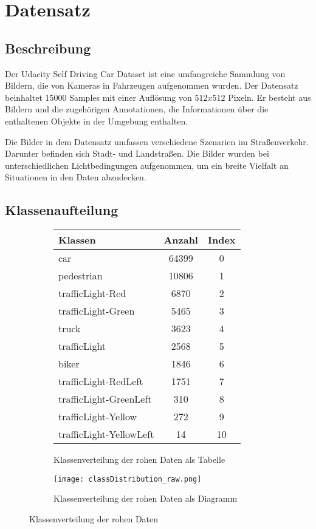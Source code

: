 \chapter{Datensatz}\label{chap:dataset}
\section{Beschreibung}
Der Udacity Self Driving Car Dataset \cite{datasetSelfDrivingCar} ist eine umfangreiche Sammlung von Bildern, die von Kameras in Fahrzeugen aufgenommen wurden. Der Datensatz beinhaltet 15000 Samples mit einer Auflösung von $512x512$ Pixeln. Er besteht aus Bildern und die zugehörigen Annotationen, die Informationen über die enthaltenen Objekte in der Umgebung enthalten.

Die Bilder in dem Datensatz umfassen verschiedene Szenarien im Straßenverkehr. Darunter befinden sich Stadt- und Landstraßen. Die Bilder wurden bei unterschiedlichen Lichtbedingungen aufgenommen, um ein breite Vielfalt an Situationen in den Daten abzudecken. 


\section{Klassenaufteilung}
\begin{figure}
	\begin{subfigure}{0.5\textwidth}
		\centering
		\begin{tabular}{l|c|c}
			\hline
			Klassen & Anzahl & Index \\
			\hline
			\hline
			car & 64399 & 0 \\
			pedestrian & 10806 & 1 \\
			trafficLight-Red & 6870 & 2 \\
			trafficLight-Green & 5465 & 3 \\
			truck & 3623 & 4 \\
			trafficLight & 2568 & 5 \\
			biker & 1846 & 6 \\
			trafficLight-RedLeft & 1751 & 7 \\
			trafficLight-GreenLeft & 310 & 8 \\
			trafficLight-Yellow & 272 & 9 \\
			trafficLight-YellowLeft & 14 & 10 \\
			\hline
		\end{tabular}
		\caption{Klassenverteilung der rohen Daten als Tabelle}
		\label{tab:classDistributionRaw_graph}
	\end{subfigure}%
	\begin{subfigure}{0.5\textwidth}
	\centering
	\texttt{[image: classDistribution\_raw.png]}
	\caption{Klassenverteilung der rohen Daten als Diagramm}
	\label{fig:classDistributionRaw_graph}
	\end{subfigure}%
	\caption{Klassenverteilung der rohen Daten}
	\label{fig:classDistributionRaw}
\end{figure}

